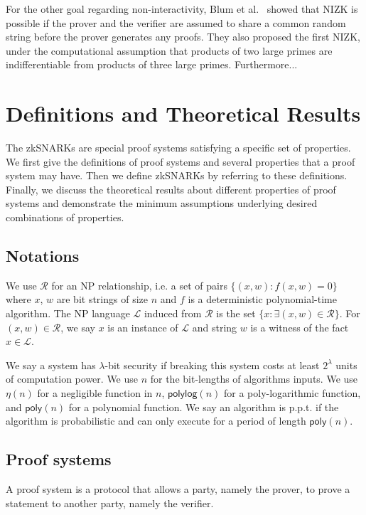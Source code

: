 \documentclass[acmtog]{acmart}
\newcommand{\cL}{\mathcal{L}}
\newcommand{\cR}{\mathcal{R}}
\newcommand{\polylog}{\mathsf{polylog}}
\newcommand{\poly}{\mathsf{poly}}
\begin{document}
For the other goal regarding non-interactivity, Blum et al.~\cite{BlumFM88} showed that NIZK is possible if the prover and the verifier are assumed to share a common random string before the prover generates any proofs.
They also proposed the first NIZK, under the computational assumption that products of two large primes are indifferentiable from products of three large primes.
Furthermore...

\section{Definitions and Theoretical Results}

The zkSNARKs are special proof systems satisfying a specific set of properties.
We first give the definitions of proof systems and several properties that a proof system may have.
Then we define zkSNARKs by referring to these definitions.
Finally, we discuss the theoretical results about different properties of proof systems and demonstrate the minimum assumptions underlying desired combinations of properties.

\subsection{Notations}

We use $\cR$ for an NP relationship, i.e. a set of pairs $\{(x,w):f(x,w)=0\}$ where $x$, $w$ are bit strings of size $n$ and $f$ is a deterministic polynomial-time algorithm.
The NP language $\cL$ induced from $\cR$ is the set $\{x:\exists (x,w)\in\cR\}$.
For $(x,w)\in\cR$, we say $x$ is an instance of $\cL$ and string $w$ is a witness of the fact $x\in\cL$.

We say a system has $\lambda$-bit security if breaking this system costs at least $2^{\lambda}$ units of computation power.
We use $n$ for the bit-lengths of algorithms inputs.
We use $\eta(n)$ for a negligible function in $n$, $\polylog(n)$ for a poly-logarithmic function, and $\poly(n)$ for a polynomial function.
We say an algorithm is p.p.t. if the algorithm is probabilistic and can only execute for a period of length $\poly(n)$.

\subsection{Proof systems}
\label{sec:proof.system}

A proof system is a protocol that allows a party, namely the prover, to prove a statement to another party, namely the verifier.
\end{document}
